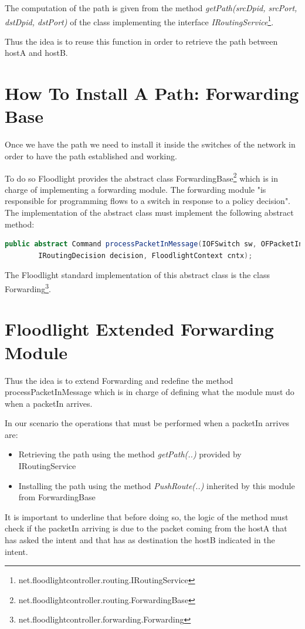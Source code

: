 \documentclass[a4paper]{report}
\begin{document}
	\noindent The computation of the path is given from the method \textit{getPath(srcDpid, srcPort, dstDpid, dstPort)} of the class implementing the interface \textit{IRoutingService}\footnote{net.floodlightcontroller.routing.IRoutingService}.
	
	\noindent Thus the idea is to reuse this function in order to retrieve the path between hostA and hostB.
	
	\section{How To Install A Path: Forwarding Base}
	\noindent Once we have the path we need to install it inside the switches of the network in order to have the path established and working.
	
	\noindent To do so Floodlight provides the abstract class ForwardingBase\footnote{net.floodlightcontroller.routing.ForwardingBase} which is in charge of implementing a forwarding module. The forwarding module "is responsible for programming flows to a switch in response to a policy decision". The implementation of the abstract class must implement the following abstract method:
	
	\begin{lstlisting}[language=Java]
		public abstract Command processPacketInMessage(IOFSwitch sw, OFPacketIn pi, 
		IRoutingDecision decision, FloodlightContext cntx);
	\end{lstlisting}
	
	
	\noindent The Floodlight standard implementation of this abstract class is the class Forwarding\footnote{net.floodlightcontroller.forwarding.Forwarding}.
	
	\section{Floodlight Extended Forwarding Module}\label{forwarding}
	\noindent Thus the idea is to extend Forwarding and redefine the method processPacketInMessage which is in charge of defining what the module must do when a packetIn arrives.
	
	\noindent In our scenario the operations that must be performed when a packetIn arrives are:
	\begin{itemize}
		\item Retrieving the path using the method \textit{getPath(..)} provided by IRoutingService
		\item Installing the path using the method \textit{PushRoute(..)} inherited by this module from ForwardingBase
	\end{itemize}
	\noindent It is important to underline that before doing so, the logic of the method must check if the packetIn arriving is due to the packet coming from the hostA that has asked the intent and that has as destination the hostB indicated in the intent.
	
\end{document}
